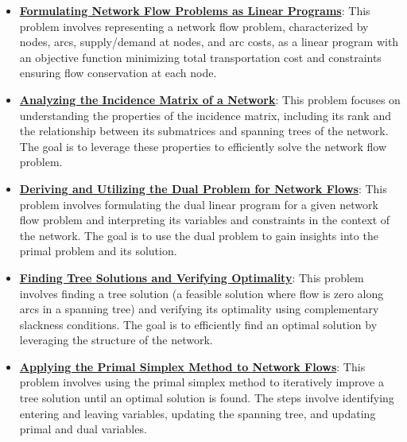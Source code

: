 \documentclass{article}%
\begin{document}
\begin{itemize}[leftmargin=*]%
\item \href{https://www.math.purdue.edu/~yipn/421//2024-11-05-NetFlows.pdf#page=2}{\textbf{Formulating Network Flow Problems as Linear Programs}}: This problem involves representing a network flow problem, characterized by nodes, arcs, supply/demand at nodes, and arc costs, as a linear program with an objective function minimizing total transportation cost and constraints ensuring flow conservation at each node.%
\item \href{https://www.math.purdue.edu/~yipn/421//2024-11-05-NetFlows.pdf#page=5}{\textbf{Analyzing the Incidence Matrix of a Network}}: This problem focuses on understanding the properties of the incidence matrix, including its rank and the relationship between its submatrices and spanning trees of the network.  The goal is to leverage these properties to efficiently solve the network flow problem.%
\item \href{https://www.math.purdue.edu/~yipn/421//2024-11-05-NetFlows.pdf#page=7}{\textbf{Deriving and Utilizing the Dual Problem for Network Flows}}: This problem involves formulating the dual linear program for a given network flow problem and interpreting its variables and constraints in the context of the network.  The goal is to use the dual problem to gain insights into the primal problem and its solution.%
\item \href{https://www.math.purdue.edu/~yipn/421//2024-11-05-NetFlows.pdf#page=10}{\textbf{Finding Tree Solutions and Verifying Optimality}}: This problem involves finding a tree solution (a feasible solution where flow is zero along arcs in a spanning tree) and verifying its optimality using complementary slackness conditions.  The goal is to efficiently find an optimal solution by leveraging the structure of the network.%
\item \href{https://www.math.purdue.edu/~yipn/421//2024-11-05-NetFlows.pdf#page=22}{\textbf{Applying the Primal Simplex Method to Network Flows}}: This problem involves using the primal simplex method to iteratively improve a tree solution until an optimal solution is found.  The steps involve identifying entering and leaving variables, updating the spanning tree, and updating primal and dual variables.%
\end{itemize}%
\end{document}
